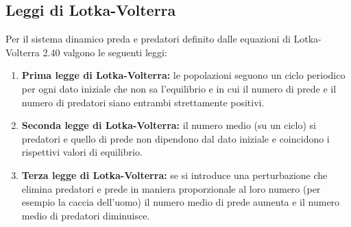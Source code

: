 \newpage



\subsection{Leggi di Lotka-Volterra}

\begin{theorem}
Per il sistema dinamico preda e predatori definito dalle equazioni di Lotka-Volterra 2.40 valgono le seguenti leggi:
\begin{enumerate}
	\item \textbf{Prima legge di Lotka-Volterra:} le popolazioni seguono un ciclo periodico per ogni dato iniziale che non sa l'equilibrio e in cui il numero di prede e il numero di predatori siano entrambi strettamente positivi.
	\item \textbf{Seconda legge di Lotka-Volterra:} il numero medio (su un ciclo) si predatori e quello di prede non dipendono dal dato iniziale e coincidono i rispettivi valori di equilibrio.
	\item \textbf{Terza legge di Lotka-Volterra:} se si introduce una perturbazione che elimina predatori e prede in maniera proporzionale al loro numero (per esempio la caccia dell'uomo) il numero medio di prede aumenta e il numero medio di predatori diminuisce.
\end{enumerate}	
\end{theorem}


